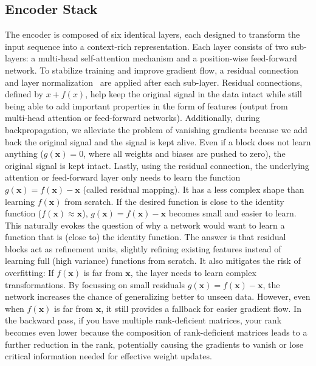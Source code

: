 \subsection{Encoder Stack} 
The encoder is composed of six identical layers, each designed to transform the input sequence into a context-rich representation.
Each layer consists of two sub-layers: a multi-head self-attention mechanism and a position-wise feed-forward network.
To stabilize training and improve gradient flow, a residual connection~\cite{he2015deepresiduallearningimage} and layer normalization~\cite{ba2016layernormalization} are applied after each sub-layer.
Residual connections, defined by \(x + f(x)\), help keep the original signal in the data intact while still being able to add important properties in the form of features (output from multi-head attention or feed-forward networks). Additionally, during backpropagation, we alleviate the problem of vanishing gradients because we add back the original signal and the signal is kept alive. Even if a block does not learn anything (\(g(\mathbf{x}) = 0\), where all weights and biases are pushed to zero), the original signal is kept intact. Lastly, using the residual connection, the underlying attention or feed-forward layer only needs to learn the function \(g(\mathbf{x})=f(\mathbf{x})-\mathbf{x}\) (called residual mapping). It has a less complex shape than learning \(f(\mathbf{x})\) from scratch. If the desired function is close to the identity function (\(f(\mathbf{x}) \approx \mathbf{x}\)), \(g(\mathbf{x}) = f(\mathbf{x}) - \mathbf{x}\) becomes small and easier to learn. This naturally evokes the question of why a network would want to learn a function that is (close to) the identity function. The answer is that residual blocks act as refinement units, slightly refining existing features instead of learning full (high variance) functions from scratch. It also mitigates the risk of overfitting: If \(f(\mathbf{x})\) is far from \(\mathbf{x}\), the layer needs to learn complex transformations. By focussing on small residuals \(g(\mathbf{x}) = f(\mathbf{x}) - \mathbf{x}\), the network increases the chance of generalizing better to unseen data. However, even when \(f(\mathbf{x})\) is far from \(\mathbf{x}\), it still provides a fallback for easier gradient flow.
In the backward pass, if you have multiple rank-deficient matrices, your rank becomes even lower
because the composition of rank-deficient matrices leads to a further reduction in the rank, potentially causing the gradients to vanish or lose critical information needed for effective weight updates.

